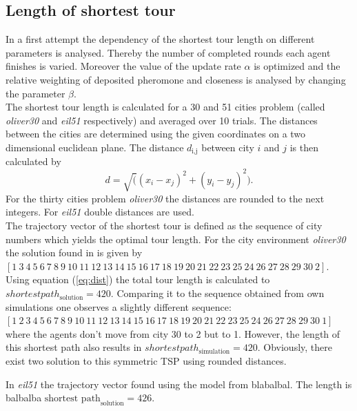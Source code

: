 

\subsection{Length of shortest tour}

In a first attempt the dependency of the shortest tour length on different parameters is analysed. Thereby the number of completed rounds each agent finishes is varied. Moreover the value of the update rate $\alpha$ is optimized and the relative weighting of deposited pheromone and closeness is analysed by changing the parameter $\beta$. \\

The shortest tour length is calculated for a 30 and 51 cities problem (called \emph{oliver30} and \emph{eil51} respectively) and averaged over 10 trials. The distances between the cities are determined using the given coordinates on a two dimensional euclidean plane. The distance $d_\text{i,j}$ between city $i$ and $j$ is then calculated by
\begin{equation}
d = \sqrt((x_i-x_j)^2+(y_i-y_j)^2).
\label{eq:dist}
\end{equation}
For the thirty cities problem \emph{oliver30} the distances are rounded to the next integers. For \emph{eil51} double distances are used.\\

The trajectory vector of the shortest tour is defined as the sequence of city numbers which yields the optimal tour length. For the city environment \emph{oliver30} the solution found in \cite{oli} is given by $[1~3~  4~  5~  6~  7~  8~  9~  10~  11~  12~  13~  14~  15~  16~  17~  18~  19~  20~  21~  22~  23~  25~  24~  26~  27~  28~  29~  30~  2]$. Using equation (\ref{eq:dist}) the total tour length is calculated to $shortest path_\text{solution} = 420$. Comparing it to the sequence obtained from own simulations one observes a slightly different sequence: $[1~2 ~3~  4~  5~  6~  7~  8~  9~  10~  11~  12~  13~  14~  15~  16~  17~  18~  19~  20~  21~  22~  23~  25~  24~  26~  27~  28~  29~  30~  1]$ where the agents don't move from city 30 to 2 but to 1. However, the length of this shortest path also results in $shortest path_\text{simulation}=420$. Obviously, there exist two solution to this symmetric TSP using rounded distances.

In \emph{eil51} the trajectory vector found using the model from \cite{paper} blabalbal. The length is balbalba
$\text{shortest path}_\text{solution} = 426$.

